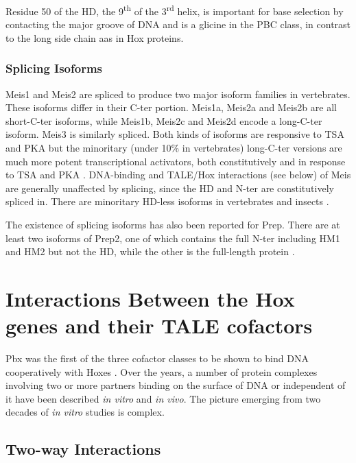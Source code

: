 Residue 50 of the \ac{HD}, the 9\textsuperscript{th} of the 3\textsuperscript{rd} helix, is important for base selection by contacting the major groove of DNA and is a glicine in the PBC class, in contrast to the long side chain \acp{aa} in Hox proteins. %

\subsubsection{Splicing Isoforms}

Meis1 and Meis2 are spliced to produce two major isoform families in vertebrates. These isoforms differ in their \ac{C-ter} portion. Meis1a, Meis2a and Meis2b are all short-\ac{C-ter} isoforms, while Meis1b, Meis2c and Meis2d encode a long-\ac{C-ter} isoform. Meis3 is similarly spliced. Both kinds of isoforms are responsive to \ac{TSA} and \ac{PKA} but the minoritary (under 10\% in vertebrates) long-\ac{C-ter} versions are much more potent transcriptional activators, both constitutively and in response to \ac{TSA} and \ac{PKA} \parencite{Huang2005, Irimia2011}. DNA-binding and TALE/Hox interactions (see below) of Meis are generally unaffected by splicing, since the \ac{HD} and \ac{N-ter} are constitutively spliced in. There are minoritary \ac{HD}-less isoforms in vertebrates and insects \parencite{Irimia2011}. 

The existence of splicing isoforms has also been reported for Prep. There are at least two isoforms of Prep2, one of which contains the full \ac{N-ter} including HM1 and HM2 but not the \ac{HD}, while the other is the full-length protein \parencite{Haller2004}.

\section{Interactions Between the Hox genes and their TALE cofactors}
\label{sec:interactions}

Pbx was the first of the three cofactor classes to be shown to bind DNA cooperatively with Hoxes \parencite{Chan1994}. Over the years, a number of protein complexes involving two or more partners binding on the surface of DNA or independent of it have been described \textit{in vitro} and \textit{in vivo}. The picture emerging from two decades of \textit{in vitro} studies is complex. 

\subsection{Two-way Interactions}

